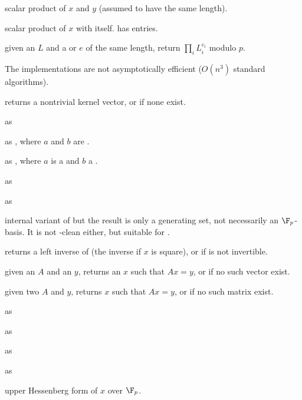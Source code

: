  scalar product of
$x$ and $y$ (assumed to have the same length).

 scalar product of $x$ with itself.
has  entries.

 given an  $L$
and a  or  $e$ of the same length, return $\prod_i L_i^{e_i}$
modulo $p$.

 The implementations are not
asymptotically efficient ($O(n^3)$ standard algorithms).

 returns a nontrivial kernel vector,
or  if none exist.

 as 

 as , where $a$ and
$b$ are .

 as , where $a$
is a  and $b$ a .

 as 

 as 

 internal variant of
 but the result is only a generating set, not
necessarily an $\F_p$-basis. It is not -clean either, but
suitable for .

 returns a left inverse of 
(the inverse if $x$ is square), or  if  is not invertible.

 given an  $A$ and an  $y$, returns an $x$ such that $Ax =
 y$, or  if no such vector exist.

given two  $A$ and $y$, returns $x$ such that $Ax = y$, or 
if no such matrix exist.

 as 

 as 

 as 

 as 

 upper Hessenberg form of $x$ over $\F_p$.


